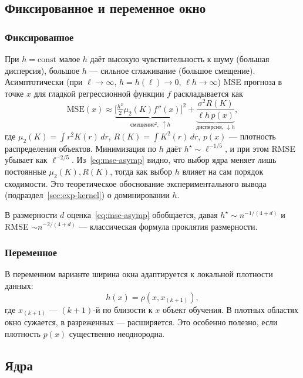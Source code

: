 \documentclass[12pt,a4paper]{article}
\theoremstyle{definition}
\theoremstyle{remark}
\begin{document}
\subsection{Фиксированное и переменное окно}

\subsubsection{Фиксированное}

При $h=\mathrm{const}$ малое $h$ даёт высокую чувствительность к шуму
(большая дисперсия), большое $h$ --- сильное сглаживание (большое смещение).
Асимптотически (при $\ell\to\infty$, $h=h(\ell)\to 0$, $\ell h\to\infty$) MSE
прогноза в точке $x$ для гладкой регрессионной функции $f$ раскладывается как
\begin{equation}
    \mathrm{MSE}(x)\approx
    \underbrace{\bigl[\tfrac{h^{2}}{2}\mu_{2}(K)f''(x)\bigr]^{2}}_{\text{смещение}^{2},\ \uparrow h}
    +
    \underbrace{\frac{\sigma^{2}R(K)}{\ell h\,p(x)}}_{\text{дисперсия},\ \downarrow h},
    \label{eq:mse-asymp}
\end{equation}
где $\mu_{2}(K)=\int r^{2}K(r)\,dr$, $R(K)=\int K^{2}(r)\,dr$, $p(x)$ ---
плотность распределения объектов. Минимизация по $h$ даёт
$h^{\star}\sim\ell^{-1/5}$, и при этом RMSE убывает как $\ell^{-2/5}$.
Из~\eqref{eq:mse-asymp} видно, что выбор ядра меняет лишь постоянные
$\mu_{2}(K),R(K)$, тогда как выбор $h$ влияет на сам порядок сходимости. Это
теоретическое обоснование экспериментального вывода
(подраздел~\ref{sec:exp-kernel}) о доминировании $h$.

В размерности $d$ оценка~\eqref{eq:mse-asymp} обобщается, давая
$h^{\star}\sim n^{-1/(4+d)}$ и RMSE $\sim n^{-2/(4+d)}$ --- классическая
формула проклятия размерности.

\subsubsection{Переменное}

В переменном варианте ширина окна адаптируется к локальной плотности данных:
\[
    h(x)=\rho(x,x_{(k+1)}),
\]
где $x_{(k+1)}$ --- $(k{+}1)$-й по близости к $x$ объект обучения. В плотных
областях окно сужается, в разреженных --- расширяется. Это особенно полезно,
если плотность $p(x)$ существенно неоднородна.

\subsection{Ядра}
\end{document}
